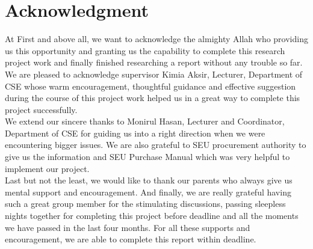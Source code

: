 \documentclass[12pt]{report} %
\begin{document}
\thispagestyle{empty}
\clearpage

















\chapter*{Acknowledgment}

At First and above all, we want to acknowledge the almighty Allah who providing us this opportunity and granting us the capability to complete this research project work and finally finished researching a report without any trouble so far. \\

We are pleased to acknowledge supervisor Kimia Aksir, Lecturer, Department of CSE whose warm encouragement, thoughtful guidance and effective suggestion during the course of this project work helped us in a great way to complete this project successfully. \\

We extend our sincere thanks to Monirul Hasan, Lecturer and Coordinator, Department of CSE for guiding us into a right direction when we were encountering bigger issues. We are also grateful to SEU procurement authority to give us the information and SEU Purchase Manual which was very helpful to implement our project. \\

Last but not the least, we would like to thank our parents who always give us mental support
and encouragement. And finally, we are really grateful having such a great group member
for the stimulating discussions, passing sleepless nights together for completing this project
before deadline and all the moments we have passed in the last four months. For all these
supports and encouragement, we are able to complete this report within deadline.

\clearpage
\end{document}
